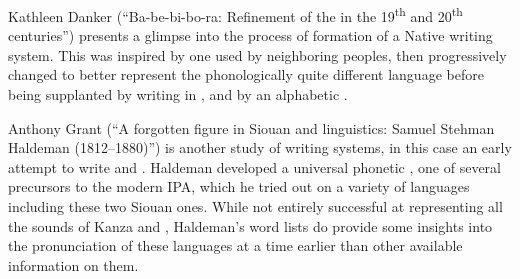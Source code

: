 \begin{refsection}
Kathleen Danker (``Ba-be-bi-bo-ra: Refinement of the   in the 19\textsuperscript{th} and 20\textsuperscript{th} centuries'') presents a glimpse into the process of formation of a Native writing system. This  was inspired by one used by neighboring  peoples, then progressively changed to better represent the phonologically quite different  language before being supplanted by writing in , and by an alphabetic  .

Anthony Grant (``A forgotten figure in Siouan and  linguistics: Samuel Stehman Haldeman (1812--1880)'') is another study of writing systems, in this case an early attempt to write  and . Haldeman developed a universal phonetic , one of several precursors to the modern IPA, which he tried out on a variety of languages including these two Siouan ones. While not entirely successful at representing all the sounds of Kanza and , Haldeman's word lists do provide some insights into the pronunciation of these languages at a time earlier than other available information on them. 

 
{\sloppy
\printbibliography[heading=subbibliography]
}

\end{refsection}
